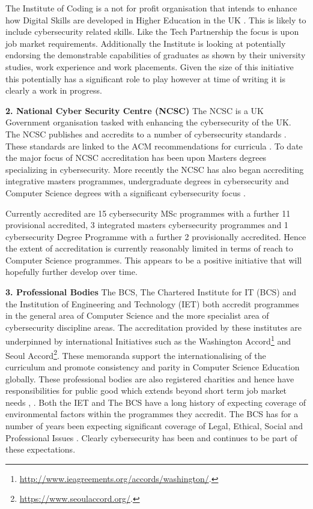 \documentclass[conference]{IEEEtran}
\begin{document}
The Institute of Coding is a not for profit organisation that intends to enhance how Digital Skills are developed in Higher Education in the UK \cite{Davenportetal2019a}. This is likely to include cybersecurity related skills. Like the Tech Partnership the focus is upon job market requirements. Additionally the Institute is looking at potentially endorsing the demonstrable capabilities of graduates as shown by their university studies, work experience and work placements. Given the size of this initiative this potentially has a significant role to play however at time of writing it is clearly a work in progress.

\textbf{2. National Cyber Security Centre (NCSC)}
The NCSC is a UK Government organisation tasked with enhancing the cybersecurity of the UK. The NCSC publishes and accredits to a number of cybersecurity standards \cite{NCSC2018a}. These standards are linked to the ACM recommendations for curricula \cite{ACM2013a}. To date the major focus of NCSC accreditation has been upon Masters degrees specializing in cybersecurity. More recently the NCSC has also began accrediting integrative masters programmes, undergraduate degrees in cybersecurity and Computer Science degrees with a significant cybersecurity focus \cite{NCSC2018b}.

Currently accredited are 15 cybersecurity MSc programmes with a further 11 provisional accredited, 3 integrated masters cybersecurity programmes and 1 cybersecurity Degree Programme with a further 2 provisionally accredited. Hence the extent of accreditation is currently reasonably limited in terms of reach to Computer Science programmes. This appears to be a positive initiative that will hopefully further develop over time. 

\textbf{3. Professional Bodies}
The BCS, The Chartered Institute for IT (BCS) and the Institution of Engineering and Technology (IET) both accredit programmes in the general area of Computer Science and the more specialist area of cybersecurity discipline areas. The accreditation provided by these institutes are underpinned by international Initiatives such as the Washington Accord\footnote{\url{http://www.ieagreements.org/accords/washington/}.} and Seoul Accord\footnote{\url{https://www.seoulaccord.org/}.}. These memoranda support the internationalising of the curriculum and promote consistency and parity in Computer Science Education globally.   These professional bodies are also registered charities and hence have responsibilities for public good which extends beyond short term job market needs \cite{Stensaker2006}, \cite{Mutereko2017}. Both the IET and The BCS have a long history of expecting coverage of environmental factors within the programmes they accredit. The BCS has for a number of years been expecting significant coverage of Legal, Ethical, Social and Professional Issues \cite{Brooke2018}. Clearly cybersecurity has been and continues to be part of these expectations. 
\end{document}
